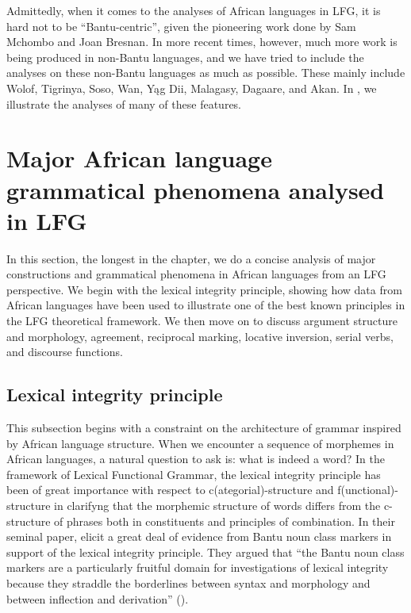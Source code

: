 \documentclass[output=paper,hidelinks]{langscibook}
\begin{document}
\largerpage
Admittedly, when it comes to the analyses of African languages in LFG, it is hard not to be “Bantu-centric”, given the pioneering work done by Sam Mchombo and Joan Bresnan. In more recent times, however, much more work is being produced in non-Bantu languages, and we have tried to include the analyses on these non-Bantu languages as much as possible. These mainly include Wolof, Tigrinya, Soso, Wan, Yąg Dii, Malagasy, Dagaare, and Akan. In , we illustrate the analyses of many of these features.

\section{Major African language grammatical phenomena analysed in LFG}
\label{sec:African:2}
\largerpage

In this section, the longest in the chapter, we do a concise analysis of major constructions and grammatical phenomena in African languages from an LFG perspective. We begin with the lexical integrity principle, showing how data from African languages have been used to illustrate one of the best known principles in the LFG theoretical framework. We then move on to discuss argument structure and morphology, agreement, reciprocal marking, locative inversion, serial verbs, and discourse functions.

\subsection{Lexical integrity principle}
\label{sec:African:2.1}

This subsection begins with a constraint on the architecture of grammar inspired by African language structure. When we encounter a sequence of morphemes in African languages, a natural question to ask is: what is indeed a word? In the framework of Lexical Functional Grammar, the lexical integrity principle has been of great importance with respect to c(ategorial)-structure and f(unctional)-structure in clarifyng that the morphemic structure of words differs from the c-structure of phrases both in constituents and principles of combination. In their seminal paper, \citet{bresnan1995the-lexical} elicit a great deal of evidence from Bantu noun class markers in support of the lexical integrity principle. They argued that “the Bantu noun class markers are a particularly fruitful domain for investigations of lexical integrity because they straddle the borderlines between syntax and morphology and between inflection and derivation” (\citealt[183]{bresnan1995the-lexical}).
\end{document}
